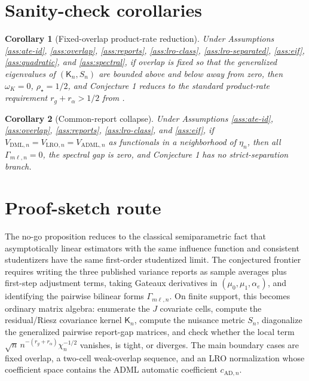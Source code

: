 \documentclass[11pt]{article}
\theoremstyle{definition}
\theoremstyle{plain}
\newtheorem{corollary}{Corollary}
\theoremstyle{remark}
\begin{document}
\section{Sanity-check corollaries}
\begin{corollary}[Fixed-overlap product-rate reduction]\label{cor:fixed-overlap}
Under Assumptions \ref{ass:ate-id}, \ref{ass:overlap}, \ref{ass:reports},
\ref{ass:lro-class}, \ref{ass:lro-separated}, \ref{ass:eif},
\ref{ass:quadratic}, and \ref{ass:spectral}, if overlap is fixed
so that the generalized eigenvalues of \((\mathsf K_n,S_n)\) are bounded above and
below away from zero, then \(\omega_K=0\), \(\rho_\star=1/2\), and
Conjecture 1 reduces to the standard product-rate requirement
\(r_g+r_\alpha>1/2\) from
\citet{ChernozhukovEtAl2018ECTJ}.
\end{corollary}

\begin{corollary}[Common-report collapse]\label{cor:common-report}
Under Assumptions \ref{ass:ate-id}, \ref{ass:overlap}, \ref{ass:reports},
\ref{ass:lro-class}, and \ref{ass:eif}, if
\(V_{\mathrm{DML},n}=V_{\mathrm{LRO},n}=V_{\mathrm{ADML},n}\) as functionals
in a neighborhood of \(\eta_n\), then all \(\Gamma_{m\ell,n}=0\), the spectral
gap is zero, and Conjecture 1 has no strict-separation branch.
\end{corollary}

\section{Proof-sketch route}
The no-go proposition reduces to the classical semiparametric fact that
asymptotically linear estimators with the same influence function and
consistent studentizers have the same first-order studentized limit.  The
conjectured frontier requires writing the three published variance reports as
sample averages plus first-step adjustment terms, taking Gateaux derivatives
in \((\mu_0,\mu_1,\alpha_e)\), and identifying the pairwise bilinear forms
\(\Gamma_{m\ell,n}\).  On finite support, this becomes ordinary matrix
algebra: enumerate the \(J\) covariate cells, compute the residual/Riesz
covariance kernel \(\mathsf K_n\), compute the nuisance metric \(S_n\), diagonalize
the generalized pairwise report-gap matrices, and
check whether the local term
\(\sqrt n\,n^{-(r_g+r_\alpha)}\chi_n^{-1/2}\) vanishes, is tight, or diverges.
The main boundary cases are fixed overlap, a two-cell
weak-overlap sequence, and an LRO normalization whose coefficient space
contains the ADML automatic coefficient \(c_{\mathrm{AD},n}\).
\end{document}
